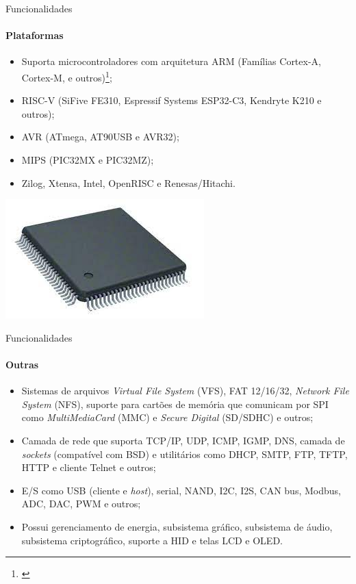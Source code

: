 \documentclass[aspectratio=169]{beamer}
\begin{document}
\begin{frame}{Funcionalidades}
\framesubtitle{Plataformas}

\begin{minipage}{0.5\textwidth}
	\begin{itemize}
		\justifying
		\item Suporta microcontroladores com arquitetura ARM (Famílias Cortex-A, Cortex-M, e outros)\footnote[frame]{\cite{wiki}};
		\item RISC-V (SiFive FE310, Espressif Systems ESP32-C3, Kendryte K210 e outros);
		\item AVR (ATmega, AT90USB e AVR32);
		\item MIPS (PIC32MX e PIC32MZ);
		\item Zilog, Xtensa, Intel, OpenRISC e Renesas/Hitachi.
	\end{itemize}
\end{minipage}%
\begin{minipage}{0.5\textwidth}
  \centering
  \includegraphics[width=0.95\linewidth]{microcontrolador.jpg}
\end{minipage}

\end{frame}

\begin{frame}{Funcionalidades}
\framesubtitle{Outras}

\begin{itemize}
	\justifying
	\item Sistemas de arquivos \textit{Virtual File System} (VFS), FAT 12/16/32, \textit{Network File System} (NFS), suporte para cartões de memória
	que comunicam por SPI como \textit{MultiMediaCard} (MMC) e \textit{Secure Digital} (SD/SDHC) e outros;
	\item Camada de rede que suporta TCP/IP, UDP, ICMP, IGMP, DNS, camada de \textit{sockets} (compatível com BSD) e utilitários como DHCP, SMTP, FTP, TFTP, HTTP e cliente Telnet e outros;
	\item E/S como USB (cliente e \textit{host}), serial, NAND, I2C, I2S, CAN bus, Modbus, ADC, DAC, PWM e outros;
	\item Possui gerenciamento de energia, subsistema gráfico, subsistema de áudio, subsistema criptográfico, suporte a HID e telas LCD e OLED.
\end{itemize}

\end{frame}
\end{document}
